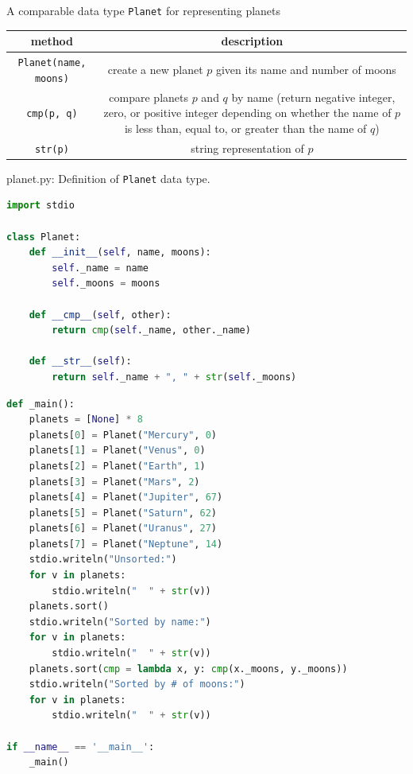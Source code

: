 \documentclass[8pt,a4paper,compress]{beamer}
\begin{document}
\begin{frame}[fragile]
\pause

A comparable data type \lstinline{Planet} for representing planets
\begin{center}
\begin{tabular}{cc}
method & description \\ \hline
\lstinline$Planet(name, moons)$ & create a new planet $p$ given its name and number of moons \\
\lstinline$cmp(p, q)$ & \makecell{compare planets $p$ and $q$ by name (return negative integer, zero, \\ or positive integer depending on whether the name of $p$ is less \\ than, equal to, or greater than the name of $q$)} \\
\lstinline$str(p)$ & string representation of $p$
\end{tabular} 
\end{center}
\end{frame}

\begin{frame}[fragile]
\pause

\begin{framed}
\tiny planet.py: Definition of \lstinline{Planet} data type.
\end{framed}

\begin{lstlisting}[language=Python,style=focusin]
import stdio

class Planet:
    def __init__(self, name, moons):
        self._name = name
        self._moons = moons

    def __cmp__(self, other):
        return cmp(self._name, other._name)
        
    def __str__(self):
        return self._name + ", " + str(self._moons)
\end{lstlisting}
\end{frame}

\begin{frame}[fragile]
\pause

\begin{lstlisting}[language=Python,style=focusin]
def _main():
    planets = [None] * 8
    planets[0] = Planet("Mercury", 0)
    planets[1] = Planet("Venus", 0)
    planets[2] = Planet("Earth", 1)
    planets[3] = Planet("Mars", 2)
    planets[4] = Planet("Jupiter", 67)
    planets[5] = Planet("Saturn", 62)
    planets[6] = Planet("Uranus", 27)
    planets[7] = Planet("Neptune", 14)
    stdio.writeln("Unsorted:")
    for v in planets:
        stdio.writeln("  " + str(v))
    planets.sort()
    stdio.writeln("Sorted by name:")
    for v in planets:
        stdio.writeln("  " + str(v))
    planets.sort(cmp = lambda x, y: cmp(x._moons, y._moons))
    stdio.writeln("Sorted by # of moons:")
    for v in planets:
        stdio.writeln("  " + str(v))

if __name__ == '__main__':
    _main()
\end{lstlisting}
\end{frame}
\end{document}
